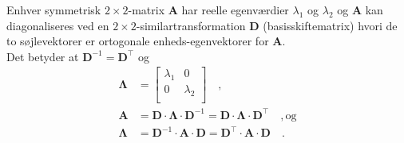 \begin{theorem} \label{thmSymDiag}
Enhver  symmetrisk $2 \times 2$-matrix $\mathbf{A}$ har reelle egenværdier $\lambda_{1}$ og $\lambda_{2}$ og $\mathbf{A}$ kan diagonaliseres ved en $2 \times 2$-similartransformation $\mathbf{D}$ (basisskiftematrix) hvori de to søjlevektorer er ortogonale enheds-egenvektorer for $\mathbf{A}$. \\

Det betyder at $\mathbf{D}^{-1} = \mathbf{D}^{\top}$ og
\begin{equation}
\begin{aligned}
\bm{\Lambda} &= \left[
                 \begin{array}{cc}
                  \lambda_{1}& 0 \\
                   0 & \lambda_{2} \\
                 \end{array}
               \right] \quad , \\
\mathbf{A} &= \mathbf{D}\cdot \bm{\Lambda}\cdot \mathbf{D}^{-1} = \mathbf{D}\cdot \bm{\Lambda}\cdot \mathbf{D}^{\top}\quad , \textrm{og}\\
\bm{\Lambda} &= \mathbf{D}^{-1}\cdot \mathbf{A}\cdot \mathbf{D} = \mathbf{D}^{\top}\cdot \mathbf{A}\cdot \mathbf{D}\quad .
\end{aligned}
\end{equation}
\end{theorem}
